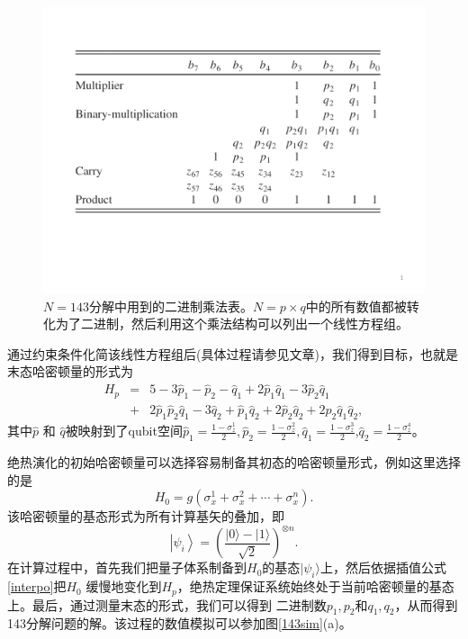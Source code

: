 \begin{figure}[htbp]
            \begin{center}
              \includegraphics[width= 0.8\columnwidth]{figures/linearset.pdf}
              \caption{$N = 143$分解中用到的二进制乘法表。$N = p\times q$中的所有数值都被转化为了二进制，然后利用这个乘法结构可以列出一个线性方程组。
              }
              \label{linearset}
            \end{center}
\end{figure}

通过约束条件化简该线性方程组后(具体过程请参见文章\cite{shor143})，我们得到目标，也就是末态哈密顿量的形式为
\begin{eqnarray}
H_p &=& 5-3 \hat{p}_1-\hat{p}_2-\hat{q}_1+2 \hat{p}_1 \hat{q}_1-3 \hat{p}_2 \hat{q}_1\nonumber\\
&+&2 \hat{p}_1 \hat{p}_2 \hat{q}_1-3 \hat{q}_2+\hat{p}_1
\hat{q}_2+2\hat{p}_2 \hat{q}_2+2 \hat{p}_2 \hat{q}_1
\hat{q}_2,\label{hp}
\end{eqnarray}
其中$\hat{p}$ 和 $\hat{q}$被映射到了qubit空间$\hat{p}_1=\frac{1-\sigma_z^1}{2},
\hat{p}_2=\frac{1-\sigma_z^2}{2}, \hat{q}_1=\frac{1-\sigma_z^3}{2}$,$ \hat{q}_2=\frac{1-\sigma_z^4}{2} $。

绝热演化的初始哈密顿量可以选择容易制备其初态的哈密顿量形式，例如这里选择的是
\begin{equation}\label{aaa}
H_0=g(\sigma_{x}^{1}+\sigma_{x}^{2}+\cdots+\sigma_{x}^{n}).
\end{equation}
该哈密顿量的基态形式为所有计算基矢的叠加，即
\begin{equation}\label{aaa}
\left \vert \psi_i \right \rangle=\left(
\frac{|0\rangle-|1\rangle}{\sqrt{2}} \right)^{\otimes n}.
\end{equation}
在计算过程中，首先我们把量子体系制备到$H_0$的基态$|\psi_i\rangle$上，然后依据插值公式\ref{interpo}把$H_0$
缓慢地变化到$H_p$，绝热定理保证系统始终处于当前哈密顿量的基态上。最后，通过测量末态的形式，我们可以得到
二进制数$p_1,p_2$和$q_1,q_2$，从而得到
143分解问题的解。该过程的数值模拟可以参加图\ref{143sim}(a)。

